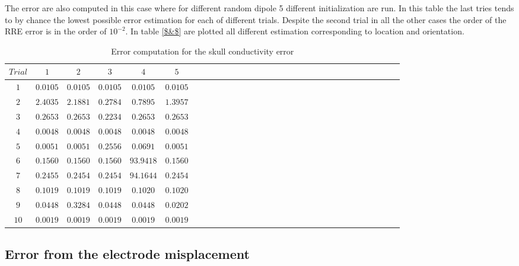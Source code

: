The error are also computed in this case where for different random dipole 5 different initialization are run. In this table the last tries tends to by chance the lowest possible error estimation for each of different trials.  Despite the second trial in all the other cases  the order of the RRE error is in the order of $10^{-2}$. 
In table \ref{$&$} are plotted all different estimation corresponding to location and orientation.
 \begin{table}[!htbp]
\centering
\caption{Error computation for the skull conductivity error}
\label{table:5}
\begin{tabular}{c c c c c c c c c c c c c c c c c c c c c c c c c c c c c c c } 
   \hline 
$Trial$&$1$&$2$&$3$&$4$&$5$\\
   \hline 
$1$&$ 0.0105$&$ 0.0105$&$ 0.0105$&$ 0.0105$&$ 0.0105$\\
$2$&$ 2.4035$&$ 2.1881$&$ 0.2784$&$ 0.7895$&$ 1.3957$\\
$3$&$ 0.2653$&$ 0.2653$&$ 0.2234$&$ 0.2653$&$ 0.2653$\\
$4$&$ 0.0048$&$ 0.0048$&$ 0.0048$&$ 0.0048$&$ 0.0048$\\
$5$&$ 0.0051$&$ 0.0051$&$ 0.2556$&$ 0.0691$&$ 0.0051$\\
$6$&$ 0.1560$&$ 0.1560$&$ 0.1560$&$93.9418$&$ 0.1560$\\
$7$&$ 0.2455$&$ 0.2454$&$ 0.2454$&$94.1644$&$ 0.2454$\\
$8$&$ 0.1019$&$ 0.1019$&$ 0.1019$&$ 0.1020$&$ 0.1020$\\
$9$&$ 0.0448$&$ 0.3284$&$ 0.0448$&$ 0.0448$&$ 0.0202$\\
$10$&$ 0.0019$&$ 0.0019$&$ 0.0019$&$ 0.0019$&$ 0.0019$\\
 \hline 

\end{tabular}
\end{table}
 


\subsection{Error from the electrode misplacement}

